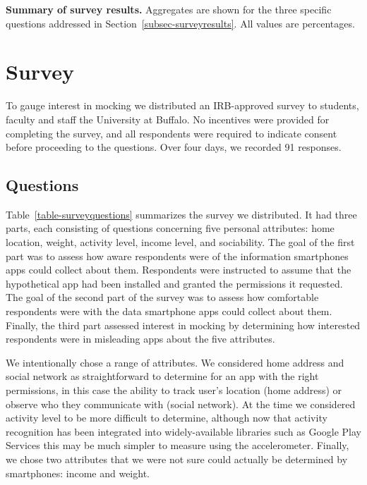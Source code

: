 
\begin{table}[t]
  
  
  
  \caption{\textbf{Summary of survey results.} Aggregates are shown for the
    three specific questions addressed in Section~\ref{subsec-surveyresults}.
    All values are percentages.}
  
  \label{table-surveysummary}

\end{table}

\section{Survey}
\label{sec-survey}

To gauge interest in mocking we distributed an IRB-approved survey to
students, faculty and staff the University at Buffalo. No incentives were
provided for completing the survey, and all respondents were required to
indicate consent before proceeding to the questions. Over four days, we
recorded 91 responses.

\subsection{Questions}

Table~\ref{table-surveyquestions} summarizes the survey we distributed. It
had three parts, each consisting of questions concerning five personal
attributes: home location, weight, activity level, income level, and
sociability. The goal of the first part was to assess how aware respondents
were of the information smartphones apps could collect about them.
Respondents were instructed to assume that the hypothetical app had been
installed and granted the permissions it requested. The goal of the second
part of the survey was to assess how comfortable respondents were with the
data smartphone apps could collect about them. Finally, the third part
assessed interest in mocking by determining how interested respondents were
in misleading apps about the five attributes.

We intentionally chose a range of attributes. We considered home address and
social network as straightforward to determine for an app with the right
permissions, in this case the ability to track user's location (home address)
or observe who they communicate with (social network). At the time we
considered activity level to be more difficult to determine, although now
that activity recognition has been integrated into widely-available libraries
such as Google Play Services this may be much simpler to measure using the
accelerometer. Finally, we chose two attributes that we were not sure could
actually be determined by smartphones: income and weight.

